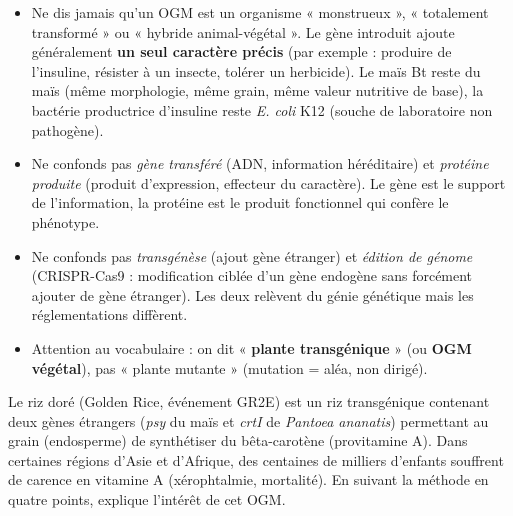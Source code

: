 \documentclass[11pt]{article}
\begin{document}
\begin{attention}
\begin{itemize}
\item Ne dis jamais qu'un OGM est un organisme « monstrueux », « totalement transformé » ou « hybride animal-végétal ». Le gène introduit ajoute généralement \textbf{un seul caractère précis} (par exemple : produire de l'insuline, résister à un insecte, tolérer un herbicide). Le maïs Bt reste du maïs (même morphologie, même grain, même valeur nutritive de base), la bactérie productrice d'insuline reste \emph{E. coli} K12 (souche de laboratoire non pathogène).
\item Ne confonds pas \emph{gène transféré} (ADN, information héréditaire) et \emph{protéine produite} (produit d'expression, effecteur du caractère). Le gène est le support de l'information, la protéine est le produit fonctionnel qui confère le phénotype.
\item Ne confonds pas \emph{transgénèse} (ajout gène étranger) et \emph{édition de génome} (CRISPR-Cas9 : modification ciblée d'un gène endogène sans forcément ajouter de gène étranger). Les deux relèvent du génie génétique mais les réglementations diffèrent.
\item Attention au vocabulaire : on dit « \textbf{plante transgénique} » (ou \textbf{OGM végétal}), pas « plante mutante » (mutation = aléa, non dirigé).
\end{itemize}
\end{attention}

\begin{exercice}
Le riz doré (Golden Rice, événement GR2E) est un riz transgénique contenant deux gènes étrangers (\emph{psy} du maïs et \emph{crtI} de \emph{Pantoea ananatis}) permettant au grain (endosperme) de synthétiser du bêta-carotène (provitamine A). Dans certaines régions d'Asie et d'Afrique, des centaines de milliers d'enfants souffrent de carence en vitamine A (xérophtalmie, mortalité). En suivant la méthode en quatre points, explique l'intérêt de cet OGM.
\end{exercice}
\end{document}
